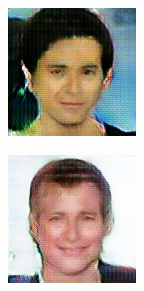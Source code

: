 \documentclass{article}
\begin{document}
\begin{center}
\begin{minipage}{0.24\linewidth}
\end{minipage}
\begin{minipage}{0.24\linewidth}
\includegraphics[width=\textwidth]{samples_16_60.png}
\end{minipage}
\begin{minipage}{0.24\linewidth}
\includegraphics[width=\textwidth]{samples_16_125.png}

\end{minipage}
\end{center}
\end{document}
